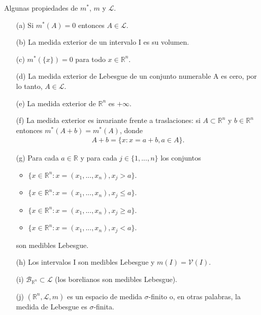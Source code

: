 \begin{prop}
Algunas propiedades de $m^*$, $m$ y $\mathcal{L}$.
\begin{enumerate}
    \item[(a)] Si $m^*(A) = 0$ entonces $A \in \mathcal{L}$.
    \item[(b)] La medida exterior de un intervalo I es  su volumen.
    \item[(c)] $m^*(\{x\}) = 0$ para todo $x \in \mathbb{R}^n$.
    \item[(d)] La medida exterior de Lebesgue de un conjunto numerable A es cero, por lo tanto, $A \in \mathcal{L}$.
    \item[(e)] La medida exterior de $\mathbb{R}^n$ es $+\infty$.
    \item[(f)] La medida exterior es invariante frente a traslaciones: si $A \subset \mathbb{R}^n$ y $b \in \mathbb{R}^n$ entonces $m^*(A + b) = m^*(A)$, donde
    \begin{align*}
        A + b = \{ x : x = a + b, a \in A \}.
    \end{align*}
    \item[(g)] Para cada $a \in \mathbb{R}$ y para cada $j \in \{1,..., n \}$ los conjuntos
    \begin{itemize}
        \item $\{x \in \mathbb{R}^n : x = (x_1,...,x_n), x_j > a\}$.
        \item $\{x \in \mathbb{R}^n : x = (x_1,...,x_n), x_j \leq a\}$.
        \item $\{x \in \mathbb{R}^n : x = (x_1,...,x_n), x_j \ge a\}$.
        \item $\{x \in \mathbb{R}^n : x = (x_1,...,x_n), x_j < a\}$.
    \end{itemize}
    son medibles Lebesgue.
    \item[(h)] Los intervalos I son medibles Lebesgue y $m(I) = \mathcal{V}(I)$.
    \item[(i)] $\mathcal{B}_{\mathbb{R}^n} \subset \mathcal{L}$ (los borelianos son medibles Lebesgue).
    \item[(j)] $(\mathbb{R}^n, \mathcal{L}, m)$ es un espacio de medida $\sigma$-finito o, en otras palabras, la medida de Lebesgue es $\sigma$-finita.
\end{enumerate}
\end{prop}

